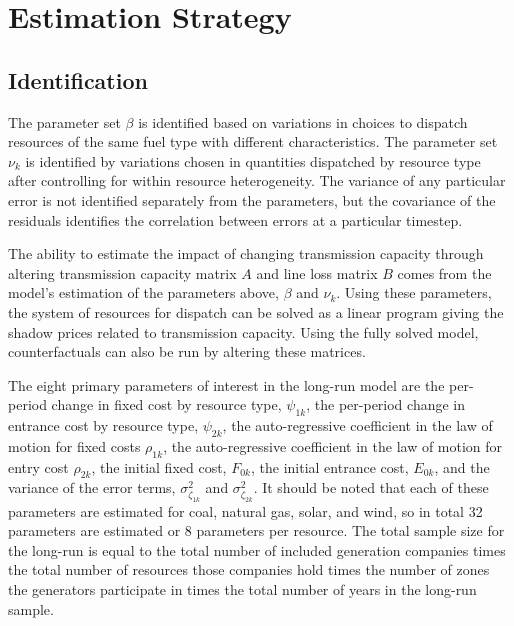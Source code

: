 \documentclass[12pt]{article}
\begin{document}
\section{Estimation Strategy} \label{sec:Estimation}

\subsection{Identification}

The parameter set $\beta$ is identified based on variations in choices to dispatch resources of the same fuel type with different characteristics. The parameter set $\nu_k$ is identified by variations chosen in quantities dispatched by resource type after controlling for within resource heterogeneity. The variance of any particular error is not identified separately from the parameters, but the covariance of the residuals identifies the correlation between errors at a particular timestep. 

The ability to estimate the impact of changing transmission capacity through altering transmission capacity matrix $A$ and line loss matrix $B$ comes from the model's estimation of the parameters above, $\beta$ and $\nu_k$. Using these parameters, the system of resources for dispatch can be solved as a linear program giving the shadow prices related to transmission capacity. Using the fully solved model, counterfactuals can also be run by altering these matrices.

The eight primary parameters of interest in the long-run model are the per-period change in fixed cost by resource type, $\psi_{1k}$, the per-period change in entrance cost by resource type, $\psi_{2k}$, the auto-regressive coefficient in the law of motion for fixed costs $\rho_{1k}$, the auto-regressive coefficient in the law of motion for entry cost $\rho_{2k}$, the initial fixed cost, $F_{0k}$, the initial entrance cost, $E_{0k}$, and the variance of the error terms, $\sigma^2_{\zeta_{1k}}$ and $\sigma^2_{\zeta_{2k}}$. It should be noted that each of these parameters are estimated for coal, natural gas, solar, and wind, so in total 32 parameters are estimated or 8 parameters per resource. The total sample size for the long-run is equal to the total number of included generation companies times the total number of resources those companies hold times the number of zones the generators participate in times the total number of years in the long-run sample. 
\end{document}
